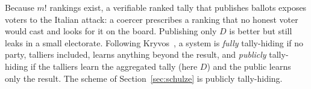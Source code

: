 Because $m!$ rankings exist, a verifiable ranked tally that publishes
ballots exposes voters to the Italian attack: a coercer prescribes a
ranking that no honest voter would cast and looks for it on the board.
Publishing only $D$ is better but still leaks in a small electorate.
Following Kryvos~\cite{kryvos2022}, a system is \emph{fully} tally-hiding
if no party, talliers included, learns anything beyond the result, and
\emph{publicly} tally-hiding if the talliers learn the aggregated tally
(here $D$) and the public learns only the result. The scheme of
Section~\ref{sec:schulze} is publicly tally-hiding.
